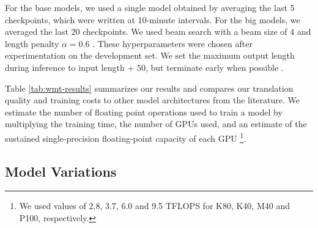 For the base models, we used a single model obtained by averaging the last 5
checkpoints, which were written at 10-minute intervals.  For the big models, we
averaged the last 20 checkpoints. We used beam search with a beam size of $4$
and length penalty $\alpha=0.6$ \citep{wu2016google}.  These hyperparameters
were chosen after experimentation on the development set.  We set the maximum
output length during inference to input length + $50$, but terminate early when
possible \citep{wu2016google}.

Table \ref{tab:wmt-results} summarizes our results and compares our translation
quality and training costs to other model architectures from the literature.
We estimate the number of floating point operations used to train a model by
multiplying the training time, the number of GPUs used, and an estimate of the
sustained single-precision floating-point capacity of each GPU \footnote{We
  used values of 2.8, 3.7, 6.0 and 9.5 TFLOPS for K80, K40, M40 and P100,
  respectively.}.

\subsection{Model Variations}

